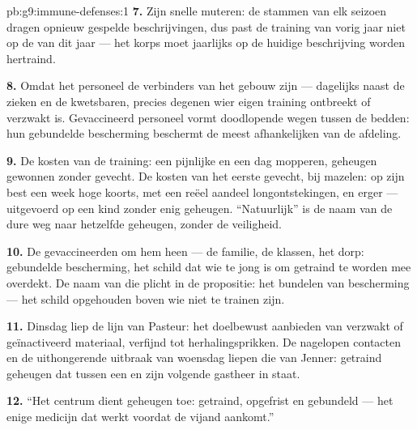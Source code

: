 \begin{solution}{pb:g9:immune-defenses:1}
\textbf{7.} Zijn snelle muteren: de stammen van elk seizoen dragen
opnieuw gespelde beschrijvingen, dus past de training van vorig
jaar niet op de  van dit jaar --- het korps moet jaarlijks
op de huidige beschrijving worden hertraind.

\textbf{8.} Omdat het personeel de verbinders van het gebouw zijn
--- dagelijks naast de zieken en de kwetsbaren, precies degenen
wier eigen training ontbreekt of verzwakt is. Gevaccineerd
personeel vormt doodlopende wegen tussen de bedden: hun gebundelde
bescherming beschermt de meest afhankelijken van de afdeling.

\textbf{9.} De kosten van de training: een pijnlijke  en een dag
mopperen, geheugen gewonnen zonder gevecht. De kosten van het
eerste gevecht, bij mazelen: op zijn best een week hoge koorts, met
een reëel aandeel longontstekingen, en erger --- uitgevoerd op een
kind zonder enig geheugen. ``Natuurlijk'' is de naam van de dure
weg naar hetzelfde geheugen, zonder de veiligheid.

\textbf{10.} De gevaccineerden om hem heen --- de familie, de
klassen, het dorp: gebundelde bescherming, het schild dat wie te
jong is om getraind te worden mee overdekt. De naam van die plicht
in de propositie: het bundelen van bescherming --- het schild
opgehouden boven wie niet te trainen zijn.

\textbf{11.} Dinsdag liep de lijn van Pasteur: het doelbewust
aanbieden van verzwakt of geïnactiveerd materiaal, verfijnd tot
herhalingsprikken. De nagelopen contacten en de uithongerende
uitbraak van woensdag liepen die van Jenner: getraind geheugen dat
tussen een  en zijn volgende gastheer in staat.

\textbf{12.} ``Het centrum dient geheugen toe: getraind,
opgefrist en gebundeld --- het enige medicijn dat werkt voordat de
vijand aankomt.''
\end{solution}
